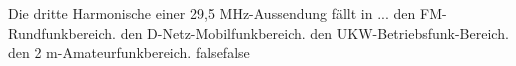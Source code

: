     {Die dritte Harmonische einer 29,5 MHz-Aussendung fällt in ...}
    {den FM-Rundfunkbereich.}
    {den D-Netz-Mobilfunkbereich.}
    {den UKW-Betriebsfunk-Bereich.}
    {den 2 m-Amateurfunkbereich.}
    {false}{false}